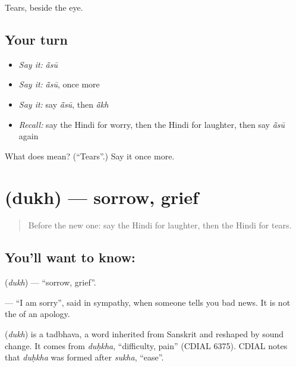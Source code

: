\begin{grammarlens}[title={What you've built}]
Tears, beside the eye.
\end{grammarlens}

\subsection*{Your turn}
\begin{itemize}
\raggedright
  \item \emph{Say it:} \emph{ā̃sū}
  \item \emph{Say it:} \emph{ā̃sū}, once more
  \item \emph{Say it:} say \emph{ā̃sū}, then \emph{ā̃kh}
  \item \emph{Recall:} say the Hindi for worry, then the Hindi for laughter, then say \emph{ā̃sū} again
\end{itemize}

\begin{tcolorbox}[breakable,colback=teal!4,colframe=teal!35!black,title={Before you move on}]
What does  mean? (\textquotedblleft{}Tears\textquotedblright{}.) Say it once more.
\end{tcolorbox}
\section[\texorpdfstring{\hi{दुख} (dukh)}{दुख (dukh)}]{ (dukh) — sorrow, grief}

\label{lesson:HI-C109-dukh}



\begin{quote}
Before the new one: say the Hindi for laughter, then the Hindi for tears.
\end{quote}

\subsection*{You'll want to know: }
\textbf{} (\emph{dukh}) — \textquotedblleft{}sorrow, grief\textquotedblright{}.

\textbf{  } — \textquotedblleft{}I am sorry\textquotedblright{}, said in sympathy, when someone tells you bad news. It is not the \textbf{ } of an apology.

\begin{cousinweb}
\textbf{} (\emph{dukh}) is a tadbhava, a word inherited from Sanskrit and reshaped by sound change. It comes from \emph{duḥkha}, \textquotedblleft{}difficulty, pain\textquotedblright{} (CDIAL 6375). CDIAL notes that \emph{duḥkha} was formed after \emph{sukha}, \textquotedblleft{}ease\textquotedblright{}.
\end{cousinweb}

